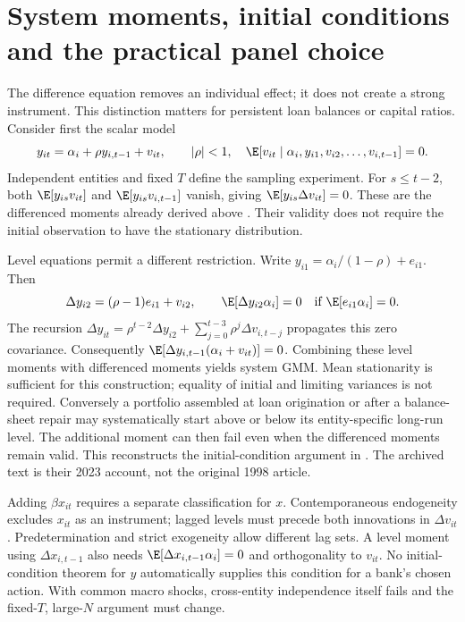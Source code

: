 \section{System moments, initial conditions and the practical panel choice}
\label{s5:dynamic-panel}
The difference equation removes an individual effect; it does not create a
strong instrument. This distinction matters for persistent loan balances or
capital ratios. Consider first the scalar model
\[
 y_{it}=\alpha_i+\rho y_{i,t-1}+v_{it},\qquad |\rho|<1,
 \quad \E[v_{it}\mid\alpha_i,y_{i1},v_{i2},\ldots,v_{i,t-1}]=0.
\]
Independent entities and fixed $T$ define the sampling experiment. For
$s\le t-2$, both $\E[y_{is}v_{it}]$ and $\E[y_{is}v_{i,t-1}]$ vanish, giving
$\E[y_{is}\Delta v_{it}]=0$. These are the differenced moments already
derived above \citep{arellano1991}. Their validity does not require the
initial observation to have the stationary distribution.

Level equations permit a different restriction. Write
$y_{i1}=\alpha_i/(1-\rho)+e_{i1}$. Then
\[
 \Delta y_{i2}=(\rho-1)e_{i1}+v_{i2},\qquad
 \E[\Delta y_{i2}\alpha_i]=0
 \quad\text{if }\E[e_{i1}\alpha_i]=0.
\]
The recursion
$\Delta y_{it}=\rho^{t-2}\Delta y_{i2}+
\sum_{j=0}^{t-3}\rho^j\Delta v_{i,t-j}$ propagates this zero covariance.
Consequently $\E[\Delta y_{i,t-1}(\alpha_i+v_{it})]=0$.
Combining these level moments with differenced moments yields system GMM.
Mean stationarity is sufficient for this construction; equality of initial
and limiting variances is not required. Conversely a portfolio assembled at
loan origination or after a balance-sheet repair may systematically start
above or below its entity-specific long-run level. The additional moment can
then fail even when the differenced moments remain valid. This reconstructs
the initial-condition argument in \citet[Sections 3.1--3.3, pp.107--109]{blundellbond2023}.
The archived text is their 2023 account, not the original 1998 article.

Adding $\beta x_{it}$ requires a separate classification for $x$.
Contemporaneous endogeneity excludes $x_{it}$ as an instrument; lagged levels
must precede both innovations in $\Delta v_{it}$. Predetermination and strict
exogeneity allow different lag sets. A level moment using $\Delta x_{i,t-1}$
also needs $\E[\Delta x_{i,t-1}\alpha_i]=0$ and orthogonality to $v_{it}$.
No initial-condition theorem for $y$ automatically supplies this condition
for a bank's chosen action. With common macro shocks, cross-entity
independence itself fails and the fixed-$T$, large-$N$ argument must change.

